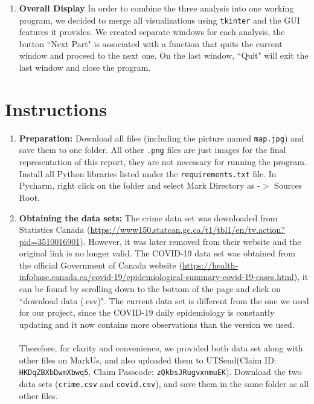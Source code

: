 \documentclass[fontsize=11pt]{article}
\begin{document}
\begin{enumerate}
\item \textbf{Overall Display}
In order to combine the three analysis into one working program, we decided to merge all visualizations using \texttt{tkinter} and the GUI features it provides. We created separate windows for each analysis, the button ``Next Part" is associated with a function that quits the current window and proceed to the next one. On the last window, ``Quit" will exit the last window and close the program. 

\end{enumerate}
\section*{Instructions}

\begin{enumerate}
  \item \textbf{Preparation:} Download all files (including the picture named \texttt{map.jpg}) and save them to one folder. All other \texttt{.png} files are just images for the final representation of this report, they are not necessary for running the program. Install all Python libraries listed under the \texttt{requirements.txt} file. In Pycharm, right click on the folder and select Mark Directory as -$>$ Sources Root.
  
  \item \textbf{Obtaining the data sets:} The crime data set was downloaded from Statistics Canada (\url{https://www150.statcan.gc.ca/t1/tbl1/en/tv.action?pid=3510016901}). However, it was later removed from their website and the original link is no longer valid. The COVID-19 data set was obtained from the official Government of Canada website (\url{https://health-infobase.canada.ca/covid-19/epidemiological-summary-covid-19-cases.html}), it can be found by scrolling down to the bottom of the page and click on ``download data (.csv)". The current data set is different from the one we used for our project, since the COVID-19 daily epidemiology is constantly updating and it now contains more observations than the version we used. 
  \\
  \\
  Therefore, for clarity and convenience, we provided both data set along with other files on MarkUs, and also uploaded them to UTSend(Claim ID: \texttt{HKDqZBXbDwmXbwq5}, Claim Passcode: \texttt{zQkbsJRugvxnmuEK}). Download the two data sets (\texttt{crime.csv} and \texttt{covid.csv}), and save them in the same folder as all other files.
  

\end{enumerate}
\end{document}
